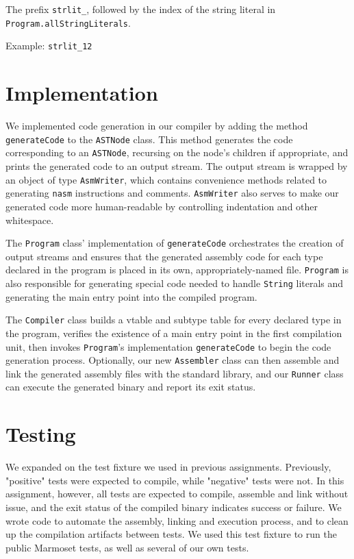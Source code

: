 \documentclass[12pt]{article}
\newcommand{\code}[1]{\texttt{#1}}
\begin{document}
The prefix \code{strlit\_}, followed by the index of the string literal in \code{Program.allStringLiterals}.

Example: \code{strlit\_12}

\section{Implementation}

We implemented code generation in our compiler by adding the method \code{generateCode} to the \code{ASTNode} class.  This method generates the code corresponding to an \code{ASTNode}, recursing on the node's children if appropriate, and prints the generated code to an output stream.  The output stream is wrapped by an object of type \code{AsmWriter}, which contains convenience methods related to generating \code{nasm} instructions and comments. \code{AsmWriter} also serves to make our generated code more human-readable by controlling indentation and other whitespace.

The \code{Program} class' implementation of \code{generateCode} orchestrates the creation of output streams and ensures that the generated assembly code for each type declared in the program is placed in its own, appropriately-named file.  \code{Program} is also responsible for generating special code needed to handle \code{String} literals and generating the main entry point into the compiled program.

The \code{Compiler} class builds a vtable and subtype table for every declared type in the program, verifies the existence of a main entry point in the first compilation unit, then invokes \code{Program}'s implementation \code{generateCode} to begin the code generation process.  Optionally, our new \code{Assembler} class can then assemble and link the generated assembly files with the standard library, and our \code{Runner} class can execute the generated binary and report its exit status.

\section{Testing}

We expanded on the test fixture we used in previous assignments.  Previously, "positive" tests were expected to compile, while "negative" tests were not.  In this assignment, however, all tests are expected to compile, assemble and link without issue, and the exit status of the compiled binary indicates success or failure.  We wrote code to automate the assembly, linking and execution process, and to clean up the compilation artifacts between tests.  We used this test fixture to run the public Marmoset tests, as well as several of our own tests.
\end{document}
